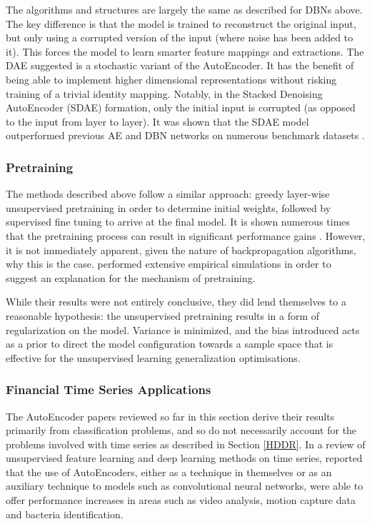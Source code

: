 \documentclass[a4paper,11pt,oneside]{article}
\theoremstyle{plain}
\theoremstyle{definition}
\begin{document}
	The algorithms and structures are largely the same as described for DBNs above. The key difference 
	is that the model is trained to reconstruct the original input, but only using a corrupted version of the input 
	(where noise has been added to it). This forces the model to learn smarter feature mappings and extractions. 
	The DAE suggested is a stochastic variant of the AutoEncoder. It has the benefit of being able to 
	implement higher dimensional representations without risking training of a trivial identity mapping. Notably, 
	in the Stacked Denoising AutoEncoder (SDAE) formation, only the initial input is corrupted (as opposed to the 
	input from layer to layer). It was shown that the SDAE model outperformed previous AE and DBN networks on 
	numerous benchmark datasets \citep{Vincent} . 
	
	\subsubsection{Pretraining}\label{lr_pretraining}
	
	The methods described above follow a similar approach: greedy layer-wise unsupervised pretraining in order to 
	determine initial weights, followed by supervised fine tuning to arrive at the final model. It is shown numerous times 
	that the pretraining process can result in significant performance gains \citep{Vincent}. However, it is not immediately apparent, 
	given the nature of backpropagation algorithms, why this is the case. \citet{Erhan} performed 
	extensive empirical simulations in order to suggest an explanation for the mechanism of pretraining.
	\hfill \break 
	
	While their results were not entirely conclusive, they did lend themselves to a reasonable hypothesis: 
	the unsupervised pretraining results in a form of regularization on the model. Variance is minimized, and the 
	bias introduced acts as a prior to direct the model configuration towards a sample space that is effective for the unsupervised 
	learning generalization optimisations.
	
	\subsubsection{Financial Time Series Applications}
	
	The AutoEncoder papers reviewed so far in this section derive their results primarily from classification problems, 
	and so do not necessarily account for the problems involved with time series as described in Section \ref{HDDR}. In 
	a review of unsupervised feature learning and deep learning methods on time series, \citet{Langkvist} reported that 
	the use of AutoEncoders, either as a technique in themselves or as an auxiliary technique to models 
	such as convolutional neural networks, were able to offer performance increases in areas such as video analysis, 
	motion capture data and bacteria identification.
	\hfill \break 
	
\end{document}
